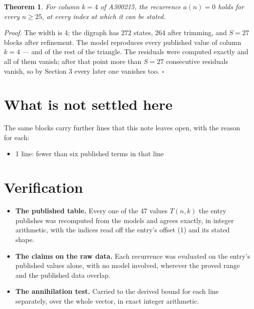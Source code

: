 \documentclass[11pt]{article}
\newtheorem{theorem}{Theorem}
\theoremstyle{definition}
\begin{document}
\begin{theorem} For column $k = 4$ of A300215, the recurrence $a(n) = 0$ holds for every $n \ge 25$, at every index at which it can be stated.\end{theorem}

{\itshape Proof.} The width is $4$; the digraph has $272$ states, $264$ after trimming, and $S = 27$ blocks after refinement. The model reproduces every published value of column $k = 4$ --- and of the rest of the triangle. The residuals were computed exactly and all of them vanish; after that point more than $S = 27$ consecutive residuals vanish, so by Section 3 every later one vanishes too. $\square$

\section{What is not settled here}

The same blocks carry further lines that this note leaves open, with the reason for each:

\begin{itemize}

\item 1 line: fewer than six published terms in that line

\end{itemize}

\section{Verification}

\begin{itemize}

\item {\bfseries The published table.} Every one of the 47 values $T(n,k)$ the entry publishes was recomputed from the models and agrees exactly, in integer arithmetic, with the indices read off the entry's offset (1) and its stated shape.

\item {\bfseries The claims on the raw data.} Each recurrence was evaluated on the entry's published values alone, with no model involved, wherever the proved range and the published data overlap.

\item {\bfseries The annihilation test.} Carried to the derived bound for each line separately, over the whole vector, in exact integer arithmetic.

\end{itemize}
\end{document}
